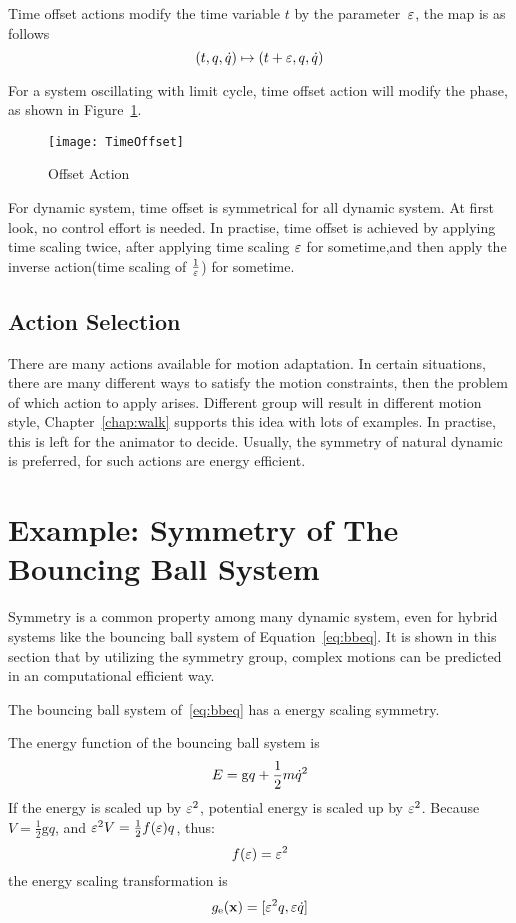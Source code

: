 Time offset actions modify the time  variable $t$ by the parameter~$\varepsilon$, the map is as follows
\[
(t,q,\dot{q}) \mapsto (t+\varepsilon,q,\dot{q})
\]


For a system oscillating with limit cycle, time offset action will modify the phase, as shown in Figure~\ref{fig:gtoff}.
\begin{figure}
  \begin{center}
      \texttt{[image: TimeOffset]}
    \caption{Offset Action}
    \label{fig:gtoff}
\end{center}
\end{figure}

For dynamic system, time offset is symmetrical for all dynamic system.
At first look, no control effort is needed.
In practise, time offset is achieved by applying time scaling twice, after applying time scaling $\varepsilon$ for sometime,and then apply the inverse action(time scaling of $\frac{1}{\varepsilon}$) for sometime.


\subsection{Action Selection}
There are many actions available for motion adaptation.
In certain situations, there are many different ways to satisfy the motion constraints, then the problem of which action to apply arises.
Different group will result in different motion style, Chapter~\ref{chap:walk} supports this idea with lots of examples.
In practise, this is left for the animator to decide.
Usually, the symmetry of natural dynamic is preferred, for such actions are energy efficient.







\section{Example: Symmetry of The Bouncing Ball System}
\label{sec:symball}
Symmetry is a common property among many dynamic system, even for hybrid systems like the bouncing ball system of Equation~\ref{eq:bbeq}.
It is shown in this section that by utilizing the symmetry group, complex motions can be predicted in an computational efficient way.

The bouncing ball system of~\ref{eq:bbeq} has a energy scaling symmetry.

The energy function of the bouncing ball system is  
\[
E=\mathrm{g}q+\frac{1}{2}m\dot{q}^2
\]
If the energy is scaled up by $\varepsilon^2$,  potential energy is scaled up by $\varepsilon^2$.
 Because $V= \frac{1}{2}\mathrm{g}q$, and $\varepsilon^2 V=\frac{1}{2}f(\varepsilon)q$, thus:
\[
f(\varepsilon)=\varepsilon^2
\]
the energy scaling transformation is
\[
g_{\mathrm{e}}(\mathbf{x})=[\varepsilon^2 q, \varepsilon \dot{q}]
\]

